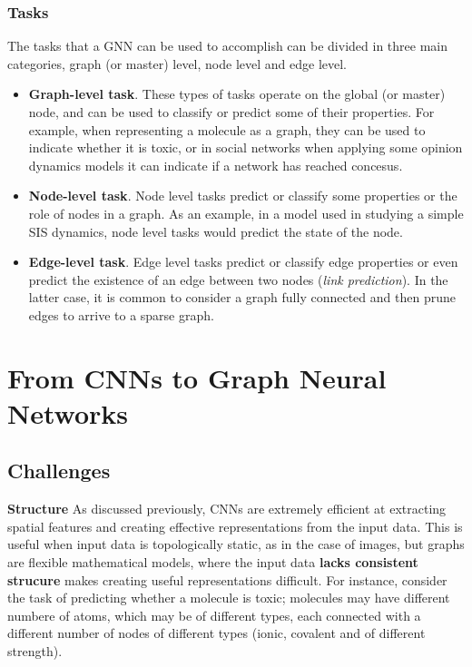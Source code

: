 \subsubsection*{Tasks}
The tasks that a GNN can be used to accomplish can be
divided in three main categories, graph (or master) level, node level and edge level.
\begin{itemize}
\item
  \textbf{Graph-level task}. These types of tasks operate
  on the global (or master) node, and can be used to classify
  or predict some of their properties. For example, when representing
  a molecule as a graph, they can be used to indicate whether it is toxic,
  or in social networks when applying some opinion dynamics models it can
  indicate if a network has reached concesus.

\item
  \textbf{Node-level task}. Node level tasks predict or classify some
  properties or the role of nodes in a graph. As an example, in a model
  used in studying a simple SIS dynamics, node level tasks would predict
  the state of the node.
\item
  \textbf{Edge-level task}. Edge level tasks predict or classify edge
    properties or even predict the existence of an edge between two nodes
    (\textit{link prediction}). In the latter case, it is common to consider
    a graph fully connected and then prune edges to arrive to a sparse graph.
\end{itemize}

\section{From CNNs to Graph Neural Networks}

\subsection{Challenges}

\textbf{Structure} As discussed previously, CNNs are extremely efficient at extracting
spatial features and creating effective representations from the input data.
This is useful when input data is topologically static, as in the
case of images, but graphs are flexible mathematical models, where
the input data \textbf{lacks consistent strucure} makes creating useful
representations difficult. For instance, consider the task of predicting 
whether a molecule is toxic; molecules may have different numbere of atoms,
which may be of different types, each connected with a different number of
nodes of different types (ionic, covalent and of different strength).


